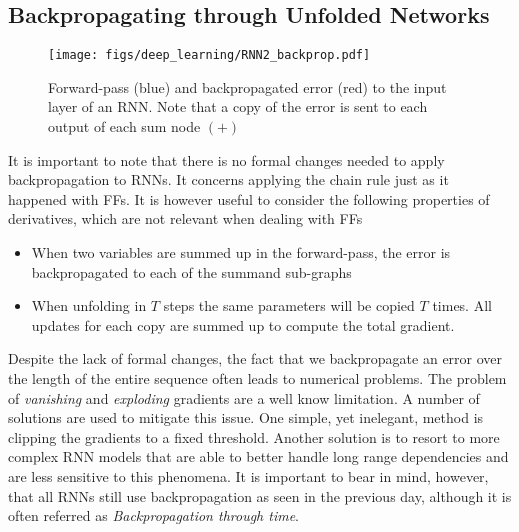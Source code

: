 \subsection{Backpropagating through Unfolded Networks}

\begin{figure}[!h]
\centering
\texttt{[image: figs/deep\_learning/RNN2\_backprop.pdf]}
        \caption{Forward-pass (blue) and backpropagated error (red) to the input layer of an RNN. Note that a copy of the error is sent to each output of each sum node $(+)$}
\label{fig:RNN}
\end{figure}

It is important to note that there is no formal changes needed to apply
backpropagation to RNNs. It concerns applying the chain rule just as it
happened with FFs. It is however useful to consider the following properties of
derivatives, which are not relevant when dealing with FFs

\begin{itemize}
\item When two variables are summed up in the forward-pass, the error is backpropagated to each of the summand sub-graphs
\item When unfolding in $T$ steps the same parameters will be copied $T$ times. All updates for each copy are summed up to compute the total gradient. 
\end{itemize}

Despite the lack of formal changes, the fact that we backpropagate an error
over the length of the entire sequence often leads to numerical problems. The
problem of \textit{vanishing} and \textit{exploding} gradients are a well know
limitation. A number of solutions are used to mitigate this issue. One simple,
yet inelegant, method is clipping the gradients to a fixed threshold. Another
solution is to resort to more complex RNN models that are able to better handle
long range dependencies and are less sensitive to this phenomena. It is
important to bear in mind, however, that all RNNs still use backpropagation as
seen in the previous day, although it is often referred as
\textit{Backpropagation through time}. 


